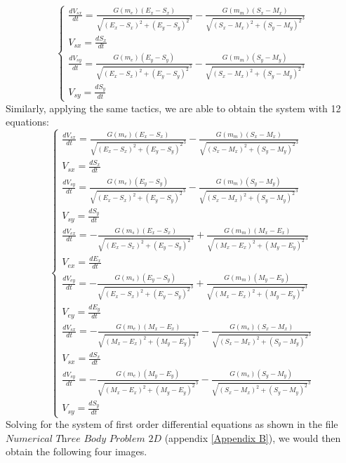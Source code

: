 \begin{equation}
    \begin{cases}
        \frac{d V_{sx}}{d t} = \frac{G (m_e) (E_x - S_x)}{\sqrt{ (E_x - S_x)^2 + (E_y - S_y)^2} ^3} - \frac{G (m_m) (S_x - M_x)}{\sqrt{ (S_x - M_x)^2 + (S_y - M_y)^2} ^3} \\
        V_{sx} = \frac{d S_x}{dt} \\
        \frac{d V_{sy}}{d t} = \frac{G (m_e) (E_y - S_y)}{\sqrt{ (E_x - S_x)^2 + (E_y - S_y)^2} ^3} - \frac{G (m_m) (S_y - M_y)}{\sqrt{ (S_x - M_x)^2 + (S_y - M_y)^2} ^3} \\
        V_{sy} = \frac{d S_y}{dt} 
    \end{cases}
    \tag{74}
\end{equation}
Similarly, applying the same tactics, we are able to obtain the system with 12 equations:
\begin{equation}
    \begin{cases}
        \frac{d V_{sx}}{d t} = \frac{G (m_e) (E_x - S_x)}{\sqrt{ (E_x - S_x)^2 + (E_y - S_y)^2} ^3} - \frac{G (m_m) (S_x - M_x)}{\sqrt{ (S_x - M_x)^2 + (S_y - M_y)^2} ^3} \\
        V_{sx} = \frac{d S_x}{dt} \\
        \frac{d V_{sy}}{d t} = \frac{G (m_e) (E_y - S_y)}{\sqrt{ (E_x - S_x)^2 + (E_y - S_y)^2} ^3} - \frac{G (m_m) (S_y - M_y)}{\sqrt{ (S_x - M_x)^2 + (S_y - M_y)^2} ^3} \\
        V_{sy} = \frac{d S_y}{dt} \\
        
        \frac{d V_{ex}}{d t} = - \frac{G (m_s) (E_x - S_x)}{\sqrt{ (E_x - S_x)^2 + (E_y - S_y)^2} ^3} + \frac{G (m_m) (M_x - E_x)}{\sqrt{ (M_x - E_x)^2 + (M_y - E_y)^2} ^3} \\
        V_{ex} = \frac{d E_x}{dt} \\
        \frac{d V_{ey}}{d t} = - \frac{G (m_s) (E_y - S_y)}{\sqrt{ (E_x - S_x)^2 + (E_y - S_y)^2} ^3} + \frac{G (m_m) (M_y - E_y)}{\sqrt{ (M_x - E_x)^2 + (M_y - E_y)^2} ^3} \\
        V_{ey} = \frac{d E_y}{dt} \\
        
        \frac{d V_{sx}}{d t} = - \frac{G (m_e) (M_x - E_x)}{\sqrt{ (M_x - E_x)^2 + (M_y - E_y)^2} ^3} - \frac{G (m_s) (S_x - M_x)}{\sqrt{ (S_x - M_x)^2 + (S_y - M_y)^2} ^3} \\
        V_{sx} = \frac{d S_x}{dt} \\
        \frac{d V_{sy}}{d t} = - \frac{G (m_e) (M_y - E_y)}{\sqrt{ (M_x - E_x)^2 + (M_y - E_y)^2} ^3} - \frac{G (m_s) (S_y - M_y)}{\sqrt{ (S_x - M_x)^2 + (S_y - M_y)^2} ^3} \\
        V_{sy} = \frac{d S_y}{dt} 
    \end{cases}
    \tag{75}
\end{equation}
Solving for the system of first order differential equations as shown in the file $\textit{Numerical Three Body Problem 2D}$ (appendix \ref{Appendix B}), we would then obtain the following four images.

